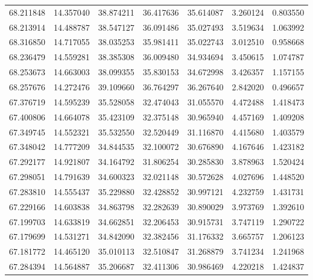 \begin{tabular}{rrrrrrr}
 68.211848 &  14.357040 &         38.874211 &         36.417636 &         35.614087 &  3.260124 &  0.803550 \\
 68.213914 &  14.488787 &         38.547127 &         36.091486 &         35.027493 &  3.519634 &  1.063992 \\
 68.316850 &  14.717055 &         38.035253 &         35.981411 &         35.022743 &  3.012510 &  0.958668 \\
 68.236479 &  14.559281 &         38.385308 &         36.009480 &         34.934694 &  3.450615 &  1.074787 \\
 68.253673 &  14.663003 &         38.099355 &         35.830153 &         34.672998 &  3.426357 &  1.157155 \\
 68.257676 &  14.272476 &         39.109660 &         36.764297 &         36.267640 &  2.842020 &  0.496657 \\
 67.376719 &  14.595239 &         35.528058 &         32.474043 &         31.055570 &  4.472488 &  1.418473 \\
 67.400806 &  14.664078 &         35.423109 &         32.375148 &         30.965940 &  4.457169 &  1.409208 \\
 67.349745 &  14.552321 &         35.532550 &         32.520449 &         31.116870 &  4.415680 &  1.403579 \\
 67.348042 &  14.777209 &         34.844535 &         32.100072 &         30.676890 &  4.167646 &  1.423182 \\
 67.292177 &  14.921807 &         34.164792 &         31.806254 &         30.285830 &  3.878963 &  1.520424 \\
 67.298051 &  14.791639 &         34.600323 &         32.021148 &         30.572628 &  4.027696 &  1.448520 \\
 67.283810 &  14.555437 &         35.229880 &         32.428852 &         30.997121 &  4.232759 &  1.431731 \\
 67.229166 &  14.603838 &         34.863798 &         32.282639 &         30.890029 &  3.973769 &  1.392610 \\
 67.199703 &  14.633819 &         34.662851 &         32.206453 &         30.915731 &  3.747119 &  1.290722 \\
 67.179699 &  14.531271 &         34.842090 &         32.382456 &         31.176332 &  3.665757 &  1.206123 \\
 67.181772 &  14.465120 &         35.010113 &         32.510847 &         31.268879 &  3.741234 &  1.241968 \\
 67.284394 &  14.564887 &         35.206687 &         32.411306 &         30.986469 &  4.220218 &  1.424837 \\

\end{tabular}

